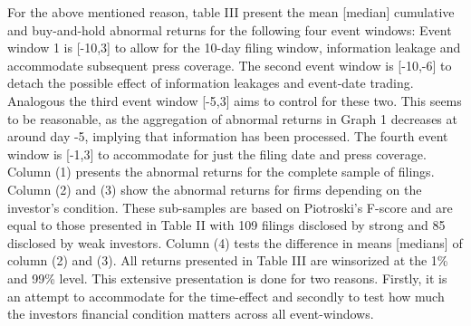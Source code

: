 \documentclass[12pt]{article}
\begin{document}

For the above mentioned reason, table III present the mean [median] cumulative and buy-and-hold abnormal returns for the following four event windows: Event window 1 is [-10,3] to allow for the 10-day filing window, information leakage and accommodate subsequent press coverage. The second event window is [-10,-6] to detach the possible effect of information leakages and event-date trading. Analogous the third event window [-5,3] aims to control for these two. This seems to be reasonable, as the aggregation of abnormal returns in Graph 1 decreases at around day -5, implying that information has been processed. The fourth event window is [-1,3] to accommodate for just the filing date and press coverage. \\
Column (1) presents the abnormal returns for the complete sample of filings. Column (2) and (3) show the abnormal returns for firms depending on the investor's condition. These sub-samples are based on Piotroski's F-score and are equal to those presented in Table II with 109 filings disclosed by strong and 85 disclosed by weak investors. Column (4) tests the difference in means [medians] of column (2) and (3). All returns presented in Table III are winsorized at the 1\% and 99\% level. This extensive presentation is done for two reasons. Firstly, it is an attempt to accommodate for the time-effect and secondly to test how much the investors financial condition matters across all event-windows. 
\end{document}
